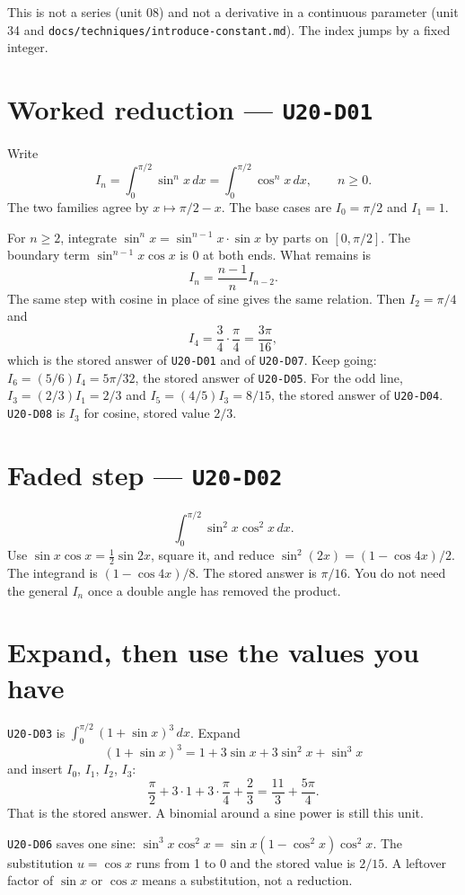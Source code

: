 This is not a series (unit 08) and not a derivative in a continuous parameter (unit 34 and \texttt{docs/techniques/introduce-constant.md}). The index jumps by a fixed integer.

\section{Worked reduction --- \texttt{U20-D01}}
Write
\[
I_n=\int_0^{\pi/2}\sin^n x\,dx=\int_0^{\pi/2}\cos^n x\,dx,\qquad n\ge 0.
\]
The two families agree by $x\mapsto\pi/2-x$. The base cases are $I_0=\pi/2$ and $I_1=1$.

For $n\ge 2$, integrate $\sin^n x=\sin^{n-1}x\cdot\sin x$ by parts on $[0,\pi/2]$. The boundary term $\sin^{n-1}x\cos x$ is 0 at both ends. What remains is
\[
I_n=\frac{n-1}{n}I_{n-2}.
\]
The same step with cosine in place of sine gives the same relation. Then $I_2=\pi/4$ and
\[
I_4=\frac34\cdot\frac\pi4=\frac{3\pi}{16},
\]
which is the stored answer of \texttt{U20-D01} and of \texttt{U20-D07}.
Keep going: $I_6=(5/6)I_4=5\pi/32$, the stored answer of \texttt{U20-D05}.
For the odd line, $I_3=(2/3)I_1=2/3$ and $I_5=(4/5)I_3=8/15$, the stored answer of \texttt{U20-D04}. \texttt{U20-D08} is $I_3$ for cosine, stored value $2/3$.

\section{Faded step --- \texttt{U20-D02}}
\[
\int_0^{\pi/2}\sin^2 x\cos^2 x\,dx.
\]
Use $\sin x\cos x=\frac12\sin 2x$, square it, and reduce $\sin^2(2x)=(1-\cos 4x)/2$. The integrand is $(1-\cos 4x)/8$. The stored answer is $\pi/16$. You do not need the general $I_n$ once a double angle has removed the product.

\section{Expand, then use the values you have}
\texttt{U20-D03} is $\int_0^{\pi/2}(1+\sin x)^3\,dx$. Expand
\[
(1+\sin x)^3=1+3\sin x+3\sin^2 x+\sin^3 x
\]
and insert $I_0$, $I_1$, $I_2$, $I_3$:
\[
\frac\pi2 + 3\cdot 1 + 3\cdot\frac\pi4 + \frac23 = \frac{11}{3}+\frac{5\pi}{4}.
\]
That is the stored answer. A binomial around a sine power is still this unit.

\texttt{U20-D06} saves one sine: $\sin^3 x\cos^2 x=\sin x(1-\cos^2 x)\cos^2 x$. The substitution $u=\cos x$ runs from 1 to 0 and the stored value is $2/15$. A leftover factor of $\sin x$ or $\cos x$ means a substitution, not a reduction.

